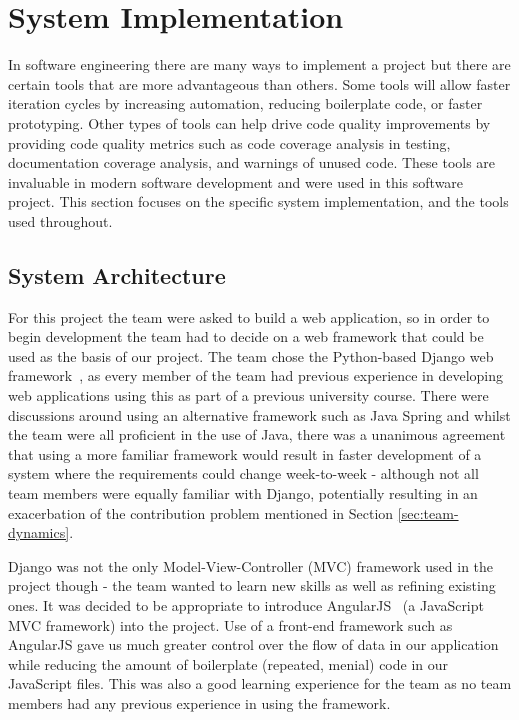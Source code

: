 \documentclass{l3proj}
\begin{document}
\section{System Implementation}
\label{sec:system-implementation}

In software engineering there are many ways to implement a project but there are certain tools that are more advantageous than others. Some tools will allow faster iteration cycles by increasing automation, reducing boilerplate code, or faster prototyping. Other types of tools can help drive code quality improvements by providing code quality metrics such as code coverage analysis in testing, documentation coverage analysis, and warnings of unused code. These tools are invaluable in modern software development and were used in this software project. This section focuses on the specific system implementation, and the tools used throughout.

\subsection{System Architecture}
\label{sec:system-implementation:system-architecture}

For this project the team were asked to build a web application, so in order to begin development the team had to decide on a web framework that could be used as the basis of our project. The team chose the Python-based Django web framework~\cite{Django}, as every member of the team had previous experience in developing web applications using this as part of a previous university course. There were discussions around using an alternative framework such as Java Spring and whilst the team were all proficient in the use of Java, there was a unanimous agreement that using a more familiar framework would result in faster development of a system where the requirements could change week-to-week - although not all team members were equally familiar with Django, potentially resulting in an exacerbation of the contribution problem mentioned in Section \ref{sec:team-dynamics}.

Django was not the only Model-View-Controller (MVC) framework used in the project though - the team wanted to learn new skills as well as refining existing ones. It was decided to be appropriate to introduce AngularJS~\cite{AngularWebpage} (a JavaScript MVC framework) into the project. Use of a front-end framework such as AngularJS gave us much greater control over the flow of data in our application while reducing the amount of boilerplate (repeated, menial) code in our JavaScript files. This was also a good learning experience for the team as no team members had any previous experience in using the framework.
\end{document}
